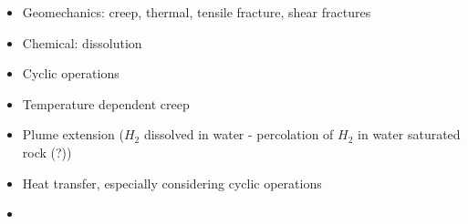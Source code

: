 \documentclass[a4paper]{article}
\begin{document}
\begin{itemize}
\item Geomechanics: creep, thermal, tensile fracture, shear fractures
\item Chemical: dissolution
\item Cyclic operations
\item Temperature dependent creep
\item Plume extension ($H_2$ dissolved in water - percolation of $H_2$ in water saturated rock (?))
\item Heat transfer, especially considering cyclic operations
\item 
\end{itemize}

\newpage


\end{document}
